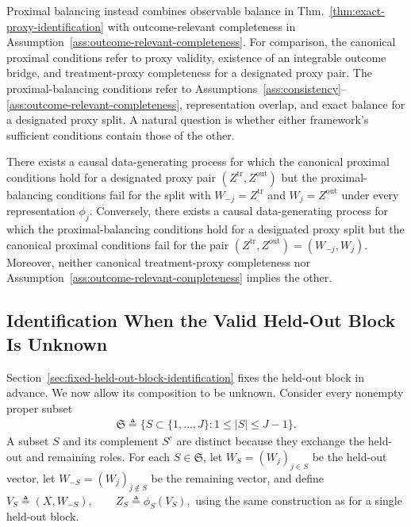 Proximal balancing instead combines observable balance in Thm.~\ref{thm:exact-proxy-identification} with outcome-relevant completeness in Assumption~\ref{ass:outcome-relevant-completeness}. For comparison, the canonical proximal conditions refer to proxy validity, existence of an integrable outcome bridge, and treatment-proxy completeness for a designated proxy pair. The proximal-balancing conditions refer to Assumptions~\ref{ass:consistency}--\ref{ass:outcome-relevant-completeness}, representation overlap, and exact balance for a designated proxy split. A natural question is whether either framework's sufficient conditions contain those of the other.

\begin{proposition}
	\label{prop:non-nesting-proximal-probe}
	\normalfont
	There exists a causal data-generating process for which the canonical proximal conditions hold for a designated proxy pair $(Z^{\mathrm{tr}},Z^{\mathrm{out}})$ but the proximal-balancing conditions fail for the split with $W_{-j}=Z^{\mathrm{tr}}$ and $W_j=Z^{\mathrm{out}}$ under every representation $\phi_j$. Conversely, there exists a causal data-generating process for which the proximal-balancing conditions hold for a designated proxy split but the canonical proximal conditions fail for the pair $(Z^{\mathrm{tr}},Z^{\mathrm{out}})=(W_{-j},W_j)$. Moreover, neither canonical treatment-proxy completeness nor Assumption~\ref{ass:outcome-relevant-completeness} implies the other.
\end{proposition}

\subsection{Identification When the Valid Held-Out Block Is Unknown}
\label{sec:unknown-valid-held-out-block}

Section~\ref{sec:fixed-held-out-block-identification} fixes the held-out block in advance. We now allow its composition to be unknown. Consider every nonempty proper subset
\begin{align}
	\mathfrak S \triangleq
	\{S\subset\{1,\ldots,J\}:1\le |S|\le J-1\}.
	\label{eq:all-held-out-orientations}
\end{align}
A subset $S$ and its complement $S^c$ are distinct because they exchange the held-out and remaining roles. For each $S\in\mathfrak S$, let $W_S=(W_j)_{j\in S}$ be the held-out vector, let $W_{-S}=(W_j)_{j\notin S}$ be the remaining vector, and define
\(V_S\triangleq(X,W_{-S}), \qquad Z_S\triangleq\phi_S(V_S),\)
using the same construction as for a single held-out block.

